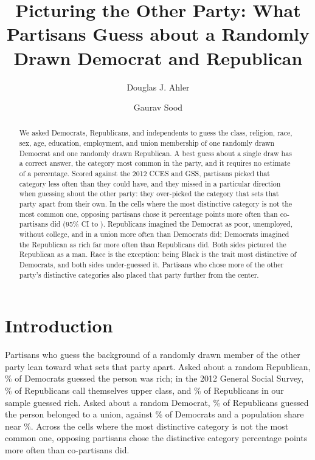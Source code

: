 \documentclass[11pt]{article}
\title{Picturing the Other Party: What Partisans Guess about a Randomly Drawn Democrat and Republican}
\author{Douglas J. Ahler \and Gaurav Sood}
\date{}
\begin{document}
\maketitle

\begin{abstract}
\noindent We asked \nAnalysis{} Democrats, Republicans, and independents to guess the class, religion, race, sex, age, education, employment, and union membership of one randomly drawn Democrat and one randomly drawn Republican. A best guess about a single draw has a correct answer, the category most common in the party, and it requires no estimate of a percentage. Scored against the 2012 CCES and GSS, partisans picked that category less often than they could have, and they missed in a particular direction when guessing about the other party: they over-picked the category that sets that party apart from their own. In the cells where the most distinctive category is not the most common one, opposing partisans chose it \gap{} percentage points more often than co-partisans did (95\% CI \gapLo{} to \gapHi{}). Republicans imagined the Democrat as poor, unemployed, without college, and in a union more often than Democrats did; Democrats imagined the Republican as rich far more often than Republicans did. Both sides pictured the Republican as a man. Race is the exception: being Black is the trait most distinctive of Democrats, and both sides under-guessed it. Partisans who chose more of the other party's distinctive categories also placed that party further from the center.
\end{abstract}

\section{Introduction}

Partisans who guess the background of a randomly drawn member of the other party lean toward what sets that party apart. Asked about a random Republican, \richOut\% of Democrats guessed the person was rich; in the 2012 General Social Survey, \richTruth\% of Republicans call themselves upper class, and \richIn\% of Republicans in our sample guessed rich. Asked about a random Democrat, \unionOut\% of Republicans guessed the person belonged to a union, against \unionIn\% of Democrats and a population share near \unionTruth\%. Across the cells where the most distinctive category is not the most common one, opposing partisans chose the distinctive category \gap{} percentage points more often than co-partisans did.
\end{document}

